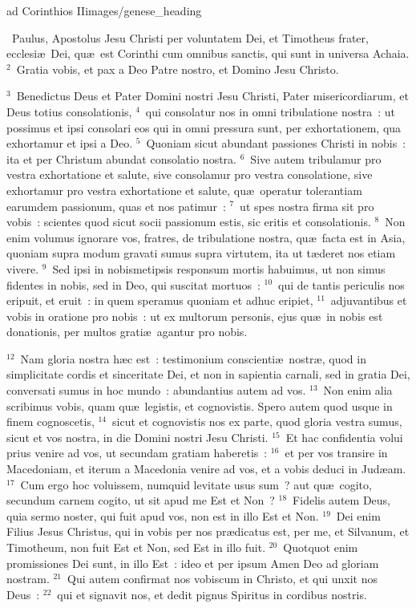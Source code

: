 {ad Corinthios II}{images/genese_heading}

~\lettrine[lines=10,image=true,loversize=0.05,lraise=-0.03]{P}{}aulus, Apostolus Jesu Christi per voluntatem Dei, et Timotheus frater, ecclesi\ae\ Dei, qu\ae\ est Corinthi cum omnibus sanctis, qui sunt in universa Achaia.
${}^{2}$~Gratia vobis, et pax a Deo Patre nostro, et Domino Jesu Christo.


${}^{3}$~Benedictus Deus et Pater Domini nostri Jesu Christi, Pater misericordiarum, et Deus totius consolationis,
${}^{4}$~qui consolatur nos in omni tribulatione nostra~: ut possimus et ipsi consolari eos qui in omni pressura sunt, per exhortationem, qua exhortamur et ipsi a Deo.
${}^{5}$~Quoniam sicut abundant passiones Christi in nobis~: ita et per Christum abundat consolatio nostra.
${}^{6}$~Sive autem tribulamur pro vestra exhortatione et salute, sive consolamur pro vestra consolatione, sive exhortamur pro vestra exhortatione et salute, qu\ae\ operatur tolerantiam earumdem passionum, quas et nos patimur~:
${}^{7}$~ut spes nostra firma sit pro vobis~: scientes quod sicut socii passionum estis, sic eritis et consolationis.
${}^{8}$~Non enim volumus ignorare vos, fratres, de tribulatione nostra, qu\ae\ facta est in Asia, quoniam supra modum gravati sumus supra virtutem, ita ut t\ae deret nos etiam vivere.
${}^{9}$~Sed ipsi in nobismetipsis responsum mortis habuimus, ut non simus fidentes in nobis, sed in Deo, qui suscitat mortuos~:
${}^{10}$~qui de tantis periculis nos eripuit, et eruit~: in quem speramus quoniam et adhuc eripiet,
${}^{11}$~adjuvantibus et vobis in oratione pro nobis~: ut ex multorum personis, ejus qu\ae\ in nobis est donationis, per multos grati\ae\ agantur pro nobis.


${}^{12}$~Nam gloria nostra h\ae c est~: testimonium conscienti\ae\ nostr\ae , quod in simplicitate cordis et sinceritate Dei, et non in sapientia carnali, sed in gratia Dei, conversati sumus in hoc mundo~: abundantius autem ad vos.
${}^{13}$~Non enim alia scribimus vobis, quam qu\ae\ legistis, et cognovistis. Spero autem quod usque in finem cognoscetis,
${}^{14}$~sicut et cognovistis nos ex parte, quod gloria vestra sumus, sicut et vos nostra, in die Domini nostri Jesu Christi.
${}^{15}$~Et hac confidentia volui prius venire ad vos, ut secundam gratiam haberetis~:
${}^{16}$~et per vos transire in Macedoniam, et iterum a Macedonia venire ad vos, et a vobis deduci in Jud\ae am.
${}^{17}$~Cum ergo hoc voluissem, numquid levitate usus sum~? aut qu\ae\ cogito, secundum carnem cogito, ut sit apud me Est et Non~?
${}^{18}$~Fidelis autem Deus, quia sermo noster, qui fuit apud vos, non est in illo Est et Non.
${}^{19}$~Dei enim Filius Jesus Christus, qui in vobis per nos pr\ae dicatus est, per me, et Silvanum, et Timotheum, non fuit Est et Non, sed Est in illo fuit.
${}^{20}$~Quotquot enim promissiones Dei sunt, in illo Est~: ideo et per ipsum Amen Deo ad gloriam nostram.
${}^{21}$~Qui autem confirmat nos vobiscum in Christo, et qui unxit nos Deus~:
${}^{22}$~qui et signavit nos, et dedit pignus Spiritus in cordibus nostris.


